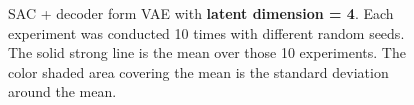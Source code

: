 \begin{figure}
    \begin{center}
        \hfill
    \end{center}
    \caption[SAC + VAE on latent dim = 4]{SAC + decoder form VAE with \textbf{latent dimension = 4}. Each experiment was conducted 10 times with different random seeds. The solid strong line is the mean over those 10 experiments. The color shaded area covering the mean is the standard deviation around the mean.}
    \label{fig:SAC_latent_4}
\end{figure}


